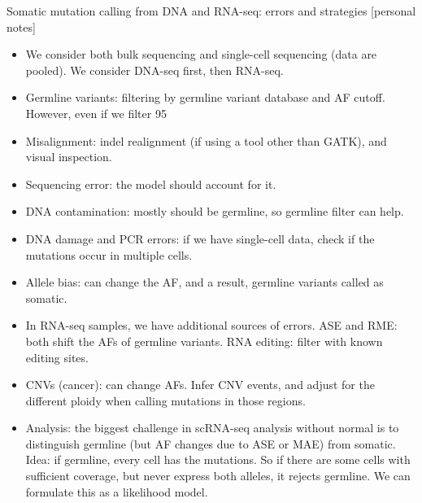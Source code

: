 \documentclass{report}
\begin{document}
Somatic mutation calling from DNA and RNA-seq: errors and strategies [personal notes]
\begin{itemize}
	
	\item We consider both bulk sequencing and single-cell sequencing (data are pooled). We consider DNA-seq first, then RNA-seq. 
	
	\item Germline variants: filtering by germline variant database and AF cutoff. However, even if we filter 95%
	
	\item Misalignment: indel realignment (if using a tool other than GATK), and visual inspection. 
	
	\item Sequencing error: the model should account for it. 
	
	\item DNA contamination: mostly should be germline, so germline filter can help. 
	
	\item DNA damage and PCR errors: if we have single-cell data, check if the mutations occur in multiple cells. 
	
	\item Allele bias: can change the AF, and a result, germline variants called as somatic. 
	
	\item In RNA-seq samples, we have additional sources of errors. ASE and RME: both shift the AFs of germline variants. RNA editing: filter with known editing sites. 
	
	\item CNVs (cancer): can change AFs. Infer CNV events, and adjust for the different ploidy when calling mutations in those regions. 
	
	\item Analysis: the biggest challenge in scRNA-seq analysis without normal is to distinguish germline (but AF changes due to ASE or MAE) from somatic. Idea: if germline, every cell has the mutations. So if there are some cells with sufficient coverage, but never express both alleles, it rejects germline. We can formulate this as a likelihood model. 
\end{itemize}
\end{document}
